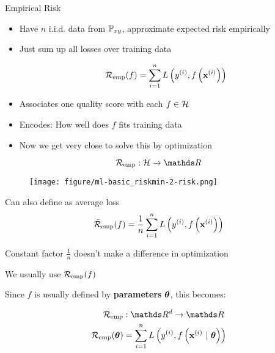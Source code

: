 \documentclass[11pt,compress,t,notes=noshow, xcolor=table]{beamer}
\begin{document}
\begin{vbframe}{Empirical Risk}
  
  \begin{itemize}
    \item Have $n$ i.i.d. data from $\mathbb{P}_{xy}$, approximate expected risk empirically %
    \item Just sum up all losses over training data
    
$$ \mathcal{R}_{\text{emp}}(f) = \sum\limits_{i=1}^n L\left(y^{(i)}, f\left(\mathbf{x}^{(i)}\right)\right) $$
    
    \item Associates one quality score with each $f \in \mathcal{H}$
    \item Encodes: How well does $f$ fits training data
    \item Now we get very close to solve this by optimization 
    
  \end{itemize}
  
  \vspace{-2ex}
$$ \riske:  \Hspace \to \R $$  
  \vspace{-2ex}
  
  \begin{figure}[!b]
    \texttt{[image: figure/ml-basic\_riskmin-2-risk.png]}
  \end{figure}
  
  \framebreak 
  
  \begin{itemizeM}
    \item Can also define as average loss
    $$
    \bar{\mathcal{R}}_{\text{emp}}(f) = \frac{1}{n}\sum\limits_{i=1}^n L\left(y^{(i)}, f\left(\mathbf{x}^{(i)}\right)\right)
    $$
    \item Constant factor $\frac{1}{n}$ doesn't make a difference in optimization
    \item We usually use $\mathcal{R}_{\text{emp}}(f)$ 
    \item Since $f$ is usually defined by \textbf{parameters} $\bm{\theta}$, this becomes:
  \end{itemizeM}
  
  \begin{align*}
    \riske & : \R^d \to \R \\
    \risket & = \sumin \Lxyit
  \end{align*}
  
\end{vbframe}

\end{document}
